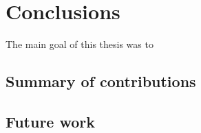 
\let\textcircled=\pgftextcircled
\chapter{Conclusions} \label{chapter:conclusions}

The main goal of this thesis was to 

\section{Summary of contributions}

\section{Future work}

